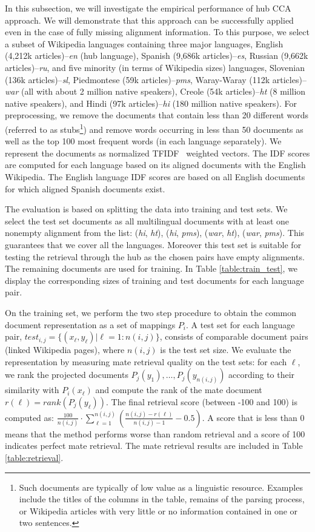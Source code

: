 In this subsection, we will investigate the empirical performance of hub CCA approach. We will demonstrate that this approach can be successfully applied even in the case of fully missing alignment information.
 To this purpose, we select a subset of Wikipedia languages containing three major languages, English (4,212k articles)--\emph{en} (hub language), Spanish (9,686k articles)--\emph{es}, Russian (9,662k articles)--\emph{ru}, and five minority (in terms of Wikipedia sizes) languages, Slovenian (136k articles)--\emph{sl}, Piedmontese (59k articles)--\emph{pms}, Waray-Waray (112k articles)--\emph{war} (all with about 2 million native speakers), Creole (54k articles)--\emph{ht} (8 million native speakers), and Hindi (97k articles)--\emph{hi} (180 million native speakers). For preprocessing, we remove the documents that contain less than 20 different words (referred to as stubs\footnote{Such documents are typically of low value as a linguistic resource. Examples include the titles of the columns in the table, remains of the parsing process, or Wikipedia articles with very little or no information contained in one or two sentences.}) and remove words occurring in less than 50 documents as well as the top 100 most frequent words (in each language separately). We represent the documents as normalized TFIDF~\cite{Salton88term-weightingapproaches} weighted vectors. The IDF scores are computed for each language based on its aligned documents with the English Wikipedia. The English language IDF scores are based on all English documents for which aligned Spanish documents exist.

The evaluation is based on splitting the data into training and test sets. %
We select the test set documents as all multilingual documents with at least one nonempty alignment from the list: (\emph{hi}, \emph{ht}), (\emph{hi}, \emph{pms}), (\emph{war}, \emph{ht}), (\emph{war}, \emph{pms}). This guarantees that we cover all the languages. Moreover this test set is suitable for testing the retrieval through the hub as the chosen pairs have empty alignments. The remaining documents are used for training. In Table \ref{table:train_test}, we display the corresponding sizes of training and test documents for each language pair.

On the training set, we perform the two step procedure to obtain the common document representation as a set of mappings $P_i$. A test set for each language pair, $test_{i,j} = \{(x_\ell,y_\ell) | \ell = 1:n(i,j)\} $, consists of comparable document pairs (linked Wikipedia pages), where $n(i,j)$ is the test set size. We evaluate the representation by measuring mate retrieval quality on the test sets: for each $\ell$, we rank the projected documents $P_j(y_1),\ldots, P_j(y_{n(i,j)})$ according to their similarity with $P_i(x_\ell)$ and compute the rank of the mate document $r(\ell) = rank(P_j(y_\ell))$. The final retrieval score (between -100 and 100) is computed as: $\frac{100}{n(i,j)} \cdot \sum_{\ell = 1}^{n(i,j)} \left( \frac{n(i,j) - r(\ell)}{n(i,j) -1} -0.5\right)$. A score that is less than 0 means that the method performs worse than random retrieval and a score of 100 indicates perfect mate retrieval. The mate retrieval results are included in Table \ref{table:retrieval}.


